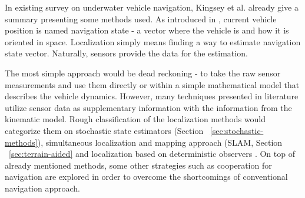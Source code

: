 In existing survey on underwater vehicle navigation, Kingsey et al. \cite{kinsey06} already give a summary presenting some methods used. As introduced in \cite{kinsey06}, current vehicle position is named navigation state - a vector where the vehicle is and how it is oriented in space. Localization simply means finding a way to estimate navigation state vector. Naturally, sensors provide the data for the estimation.

The most simple approach would be dead reckoning - to take the raw sensor measurements and use them directly or within a simple mathematical model that describes the vehicle dynamics. However, many techniques presented in literature utilize sensor data as supplementary information with the information from the kinematic model. Rough classification of the localization methods would categorize them on stochastic state estimators (Section ~\ref{sec:stochastic-methods}), simultaneous localization and mapping approach (SLAM, Section ~\ref{sec:terrain-aided} and localization based on deterministic observers \cite{kinsey06}. On top of already mentioned methods, some other strategies such as cooperation for navigation are explored \cite{bahr08} in order to overcome the shortcomings of conventional navigation approach. 

